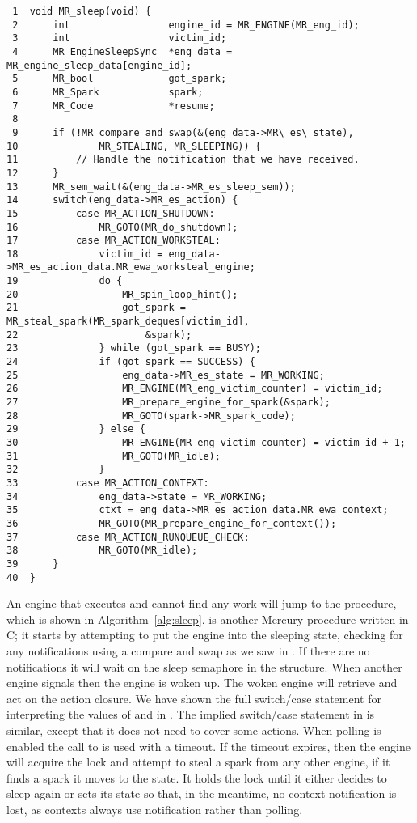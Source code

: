 \begin{algorithm}[tbp]
\begin{verbatim}
 1  void MR_sleep(void) {
 2      int                 engine_id = MR_ENGINE(MR_eng_id);
 3      int                 victim_id;
 4      MR_EngineSleepSync  *eng_data = MR_engine_sleep_data[engine_id];
 5      MR_bool             got_spark;
 6      MR_Spark            spark;
 7      MR_Code             *resume;
 8
 9      if (!MR_compare_and_swap(&(eng_data->MR\_es\_state),
10              MR_STEALING, MR_SLEEPING)) {
11          // Handle the notification that we have received.
12      }
13      MR_sem_wait(&(eng_data->MR_es_sleep_sem));
14      switch(eng_data->MR_es_action) {
15          case MR_ACTION_SHUTDOWN:
16              MR_GOTO(MR_do_shutdown);
17          case MR_ACTION_WORKSTEAL:
18              victim_id = eng_data->MR_es_action_data.MR_ewa_worksteal_engine;
19              do {
20                  MR_spin_loop_hint();
21                  got_spark = MR_steal_spark(MR_spark_deques[victim_id],
22                      &spark);
23              } while (got_spark == BUSY);
24              if (got_spark == SUCCESS) {
25                  eng_data->MR_es_state = MR_WORKING;
26                  MR_ENGINE(MR_eng_victim_counter) = victim_id;
27                  MR_prepare_engine_for_spark(&spark);
28                  MR_GOTO(spark->MR_spark_code);
29              } else {
30                  MR_ENGINE(MR_eng_victim_counter) = victim_id + 1;
31                  MR_GOTO(MR_idle);
32              }
33          case MR_ACTION_CONTEXT:
34              eng_data->state = MR_WORKING;
35              ctxt = eng_data->MR_es_action_data.MR_ewa_context;
36              MR_GOTO(MR_prepare_engine_for_context());
37          case MR_ACTION_RUNQUEUE_CHECK:
38              MR_GOTO(MR_idle);
39      }
40  }
\end{verbatim}
\caption{\sleep}
\label{alg:sleep}
\end{algorithm}

An engine that executes \idle and cannot find any work will jump to the
\sleep procedure,
which is shown in Algorithm~\ref{alg:sleep}.
\sleep is another Mercury procedure written in C;
it starts by attempting to put the engine into the sleeping state,
checking for any notifications using a compare and swap as we saw in \idle.
If there are no notifications it will wait on the sleep semaphore in the
\enginesleepsync structure.
When another engine signals  then the engine is woken up.
The woken engine will retrieve and act on the action closure.
We have shown the full switch/case statement for interpreting the values of
 and  in \sleep.
The implied switch/case statement in \idle is similar,
except that it does not need to cover some actions.
When polling is enabled the call to  is used with a
timeout.
If the timeout expires,
then the engine will acquire the lock and attempt to
steal a spark from any other engine, if it finds a spark it moves to the
 state.
It holds the lock until it either decides to sleep again or sets its state
so that, in the meantime, no context notification is lost,
as contexts always use notification rather than polling.

